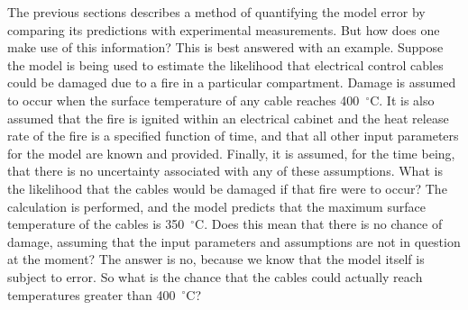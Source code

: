 The previous sections describes a method of quantifying the model error by comparing its predictions with experimental measurements. But how does one make use of this
information? This is best answered with an example. Suppose the model is being used to estimate the likelihood that electrical control cables could be damaged due to
a fire in a particular compartment. Damage is assumed to occur when the surface temperature of any cable reaches 400~$^\circ$C. It is also assumed that the fire is
ignited within an electrical cabinet and the heat release rate of the fire is a specified function of time, and that all other input
parameters for the model are known and provided. Finally, it is assumed, for the time being, that there is no uncertainty
associated with any of these assumptions. What is the likelihood that the cables would be damaged if that fire were to occur? The calculation is performed, and the
model predicts that the maximum surface temperature of the cables is 350~$^\circ$C. Does this mean that there is no chance of damage, assuming that the input parameters
and assumptions are not in question at the moment? The answer is no, because we know that the model itself is subject to error. So what is the chance that the
cables could actually reach temperatures greater than 400~$^\circ$C?


